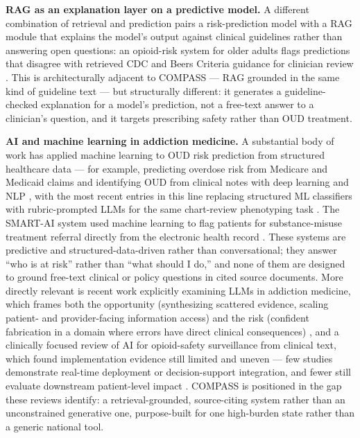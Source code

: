\documentclass[11pt]{article}
\begin{document}
\textbf{RAG as an explanation layer on a predictive model.} A different combination of retrieval and prediction pairs a risk-prediction model with a RAG module that explains the model's output against clinical guidelines rather than answering open questions: an opioid-risk system for older adults flags predictions that disagree with retrieved CDC and Beers Criteria guidance for clinician review \citep{bakshi2026}. This is architecturally adjacent to COMPASS --- RAG grounded in the same kind of guideline text --- but structurally different: it generates a guideline-checked explanation for a model's prediction, not a free-text answer to a clinician's question, and it targets prescribing safety rather than OUD treatment.

\textbf{AI and machine learning in addiction medicine.} A substantial body of work has applied machine learning to OUD risk prediction from structured healthcare data --- for example, predicting overdose risk from Medicare and Medicaid claims \citep{lociganic2019,lociganic2022} and identifying OUD from clinical notes with deep learning and NLP \citep{dong2021,dong2023,carrell2020}, with the most recent entries in this line replacing structured ML classifiers with rubric-prompted LLMs for the same chart-review phenotyping task \citep{lyu2026}. The SMART-AI system used machine learning to flag patients for substance-misuse treatment referral directly from the electronic health record \citep{afshar2022}. These systems are predictive and structured-data-driven rather than conversational; they answer ``who is at risk'' rather than ``what should I do,'' and none of them are designed to ground free-text clinical or policy questions in cited source documents. More directly relevant is recent work explicitly examining LLMs in addiction medicine, which frames both the opportunity (synthesizing scattered evidence, scaling patient- and provider-facing information access) and the risk (confident fabrication in a domain where errors have direct clinical consequences) \citep{srivastava2024}, and a clinically focused review of AI for opioid-safety surveillance from clinical text, which found implementation evidence still limited and uneven --- few studies demonstrate real-time deployment or decision-support integration, and fewer still evaluate downstream patient-level impact \citep{zitu2026}. COMPASS is positioned in the gap these reviews identify: a retrieval-grounded, source-citing system rather than an unconstrained generative one, purpose-built for one high-burden state rather than a generic national tool.
\end{document}
